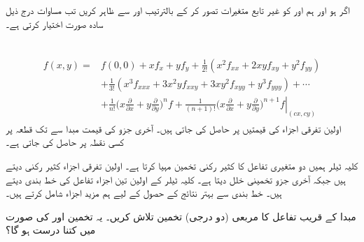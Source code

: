 اگر   ہو اور ہم  اور کو غیر تابع متغیرات تصور کر  کے بالترتیب  اور  سے ظاہر کریں تب  مساوات  درج ذیل سادہ  صورت اختیار کرتی ہے۔

\\
\begin{gather}
\begin{aligned}\label{مساوات_کثیرالمتغیر_دو_متغیری_تفاعل_ٹیلر_کلیہ_ب}
f(x,y)=&f(0,0)+xf_x+yf_y+\frac{1}{2!}(x^2f_{xx}+2xyf_{xy}+y^2f_{yy})\\
&+\frac{1}{3!}(x^3f_{xxx}+3x^2yf_{xxy}+3xy^2f_{xyy}+y^3f_{yyy})+\cdots\\
&+\frac{1}{n!}\big(x\frac{\partial}{\partial x}+y\frac{\partial}{\partial y}\big)^nf+\left.\frac{1}{(n+1)!}\big(x\frac{\partial}{\partial x}+y\frac{\partial}{\partial y}\big)^{n+1}f\right\vert_{(cx,cy)}
\end{aligned}
\end{gather}
اولین     تفرقی اجزاء  کی قیمتیں  پر حاصل کی جاتی ہیں۔ آخری جزو کی قیمت  مبدا سے  تک قطعہ پر کسی نقطہ  پر حاصل کی جاتی ہے۔

کلیہ ٹیلر ہمیں دو متغیری تفاعل  کا  کثیر رکنی تخمین مہیا کرتا ہے۔ اولین  تفرقی اجزاء کثیر رکنی دیتے ہیں جبکہ آخری جزو تخمینی خلل دیتا ہے۔ کلیہ ٹیلر کے اولین تین اجزاء  تفاعل کی خط بندی   دیتے ہیں۔ خط بندی سے بہتر نتائج کے حصول کے لیے ہم مزید اجزاء شامل کرتے ہیں۔

 مبدا کے قریب تفاعل  کا  مربعی (دو درجی) تخمین تلاش کریں۔ یہ تخمین  اور  کی صورت میں کتنا درست ہو گا؟

